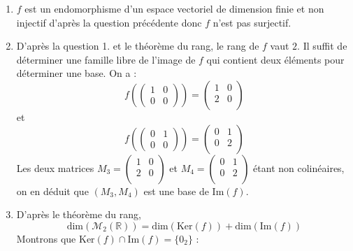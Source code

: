 \documentclass[a4paper,twoside,french,11pt]{VcCours}
\begin{document}
\begin{enumerate}
\item $f$ est un endomorphisme d'un espace vectoriel de dimension finie et non injectif d'après la question précédente donc $f$ n'est pas surjectif.
\item D'après la question 1. et le théorème du rang, le rang de $f$ vaut $2$. Il suffit de déterminer une famille libre de l'image de $f$ qui contient deux éléments pour déterminer une base. On a :
$$  f \left( \begin{pmatrix}
1 & 0 \\
0 & 0
\end{pmatrix} \right) = \begin{pmatrix}
1 & 0 \\
2 & 0 \\
\end{pmatrix}$$
et 
$$  f \left( \begin{pmatrix}
0 & 1 \\
0 & 0
\end{pmatrix} \right) = \begin{pmatrix}
0 & 1 \\
0 & 2 \\
\end{pmatrix}$$
Les deux matrices $M_3=\begin{pmatrix}
1 & 0 \\
2 & 0 \\
\end{pmatrix}$ et $M_4=\begin{pmatrix}
0 & 1 \\
0 & 2 \\
\end{pmatrix}$ étant non colinéaires, on en déduit que $(M_3,M_4)$ est une base de $\textrm{Im}(f)$.
\item D'après le théorème du rang,
$$ \textrm{dim}(\mathcal{M}_2(\mathbb{R})) = \textrm{dim}(\textrm{Ker}(f)) + \textrm{dim}(\textrm{Im}(f))$$ 
Montrons que $\textrm{Ker}(f) \cap \textrm{Im}(f) = \lbrace 0_2 \rbrace$ :


\end{enumerate}
\end{document}
